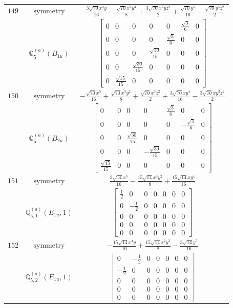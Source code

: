 \documentclass[fleqn,8pt,landscape]{jsarticle}
\begin{document}
\begin{longtable}{ccc}
$ 149 $ & $ \text{symmetry} $ & $ - \frac{3 \sqrt{70} x^{4} y}{16} - \frac{\sqrt{70} x^{2} y^{3}}{8} + \frac{3 \sqrt{70} x^{2} y z^{2}}{2} + \frac{\sqrt{70} y^{5}}{16} - \frac{\sqrt{70} y^{3} z^{2}}{2} $ \\
$  $ & $ \mathbb{Q}_{5}^{(a)}(B_{1u}) $ & $ \begin{bmatrix} 0 & 0 & 0 & 0 & 0 & \frac{\sqrt{3}}{6} & 0 \\ 0 & 0 & 0 & 0 & \frac{\sqrt{3}}{6} & 0 & 0 \\ 0 & 0 & 0 & \frac{\sqrt{30}}{15} & 0 & 0 & 0 \\ 0 & 0 & \frac{\sqrt{30}}{15} & 0 & 0 & 0 & 0 \\ 0 & \frac{\sqrt{15}}{15} & 0 & 0 & 0 & 0 & 0 \end{bmatrix} $ \\ \hline
$ 150 $ & $ \text{symmetry} $ & $ - \frac{\sqrt{70} x^{5}}{16} + \frac{\sqrt{70} x^{3} y^{2}}{8} + \frac{\sqrt{70} x^{3} z^{2}}{2} + \frac{3 \sqrt{70} x y^{4}}{16} - \frac{3 \sqrt{70} x y^{2} z^{2}}{2} $ \\
$  $ & $ \mathbb{Q}_{5}^{(a)}(B_{2u}) $ & $ \begin{bmatrix} 0 & 0 & 0 & 0 & \frac{\sqrt{3}}{6} & 0 & 0 \\ 0 & 0 & 0 & 0 & 0 & - \frac{\sqrt{3}}{6} & 0 \\ 0 & 0 & \frac{\sqrt{30}}{15} & 0 & 0 & 0 & 0 \\ 0 & 0 & 0 & - \frac{\sqrt{30}}{15} & 0 & 0 & 0 \\ \frac{\sqrt{15}}{15} & 0 & 0 & 0 & 0 & 0 & 0 \end{bmatrix} $ \\ \hline
$ 151 $ & $ \text{symmetry} $ & $ \frac{3 \sqrt{14} x^{5}}{16} - \frac{15 \sqrt{14} x^{3} y^{2}}{8} + \frac{15 \sqrt{14} x y^{4}}{16} $ \\
$  $ & $ \mathbb{Q}_{5,1}^{(a)}(E_{1u},1) $ & $ \begin{bmatrix} \frac{1}{2} & 0 & 0 & 0 & 0 & 0 & 0 \\ 0 & - \frac{1}{2} & 0 & 0 & 0 & 0 & 0 \\ 0 & 0 & 0 & 0 & 0 & 0 & 0 \\ 0 & 0 & 0 & 0 & 0 & 0 & 0 \\ 0 & 0 & 0 & 0 & 0 & 0 & 0 \end{bmatrix} $ \\ \hline
$ 152 $ & $ \text{symmetry} $ & $ - \frac{15 \sqrt{14} x^{4} y}{16} + \frac{15 \sqrt{14} x^{2} y^{3}}{8} - \frac{3 \sqrt{14} y^{5}}{16} $ \\
$  $ & $ \mathbb{Q}_{5,2}^{(a)}(E_{1u},1) $ & $ \begin{bmatrix} 0 & - \frac{1}{2} & 0 & 0 & 0 & 0 & 0 \\ - \frac{1}{2} & 0 & 0 & 0 & 0 & 0 & 0 \\ 0 & 0 & 0 & 0 & 0 & 0 & 0 \\ 0 & 0 & 0 & 0 & 0 & 0 & 0 \\ 0 & 0 & 0 & 0 & 0 & 0 & 0 \end{bmatrix} $ \\ \hline

\end{longtable}
\end{document}
